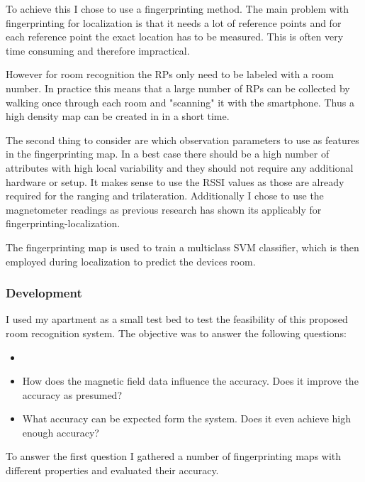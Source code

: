 To achieve this I chose to use a fingerprinting method. The main problem with fingerprinting for  localization is that it needs a lot of reference points and for each reference point the exact location has to be measured. This is often very time consuming and therefore impractical.

However for room recognition the RPs only need to be labeled with a room number. In practice this means that a large number of RPs can be collected by walking once through each room and "scanning" it with the smartphone. Thus a high density map can be created in in a short time.

The second thing to consider are which observation parameters to use as features in the fingerprinting map. In a best case there should be a high number of attributes with high local variability and they should not require any additional hardware or setup. It makes sense to use the RSSI values as those are already required for the ranging and trilateration. Additionally I chose to use the magnetometer readings as previous research has shown its applicably for fingerprinting-localization.


The fingerprinting map is used to train a multiclass SVM classifier, which is then employed during localization to predict the devices room.
\subsubsection{Development}
\label{overviewRoomRecognition}
I used my apartment as a small test bed to test the feasibility of this proposed room recognition system. The objective was to answer the following questions:
\begin{itemize}
\item {}
\item How does the magnetic field data influence the accuracy. Does it improve the accuracy as presumed?
\item What accuracy can be expected form the system. Does it even achieve high enough accuracy?
\end{itemize}

To answer the first question I gathered a number of fingerprinting maps with different properties and evaluated their accuracy.

